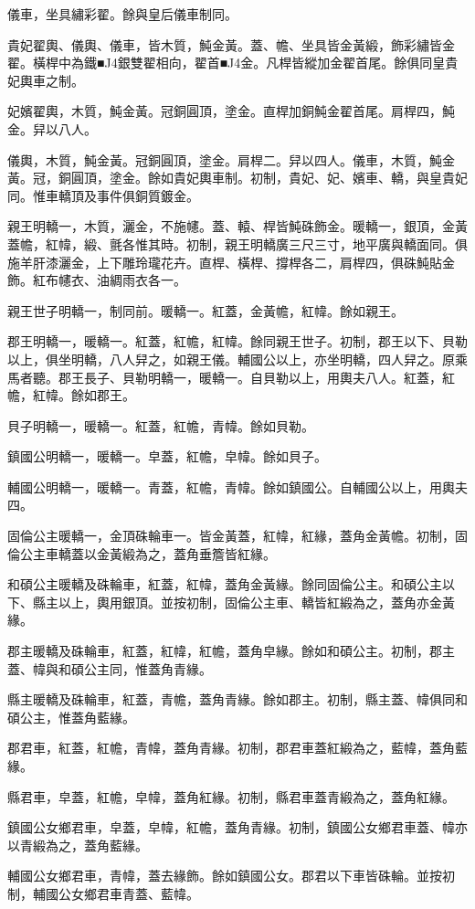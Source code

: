 \begin{pinyinscope}
儀車，坐具繡彩翟。餘與皇后儀車制同。

貴妃翟輿、儀輿、儀車，皆木質，魨金黃。蓋、幨、坐具皆金黃緞，飾彩繡皆金翟。橫桿中為鐵■J4銀雙翟相向，翟首■J4金。凡桿皆縱加金翟首尾。餘俱同皇貴妃輿車之制。

妃嬪翟輿，木質，魨金黃。冠銅圓頂，塗金。直桿加銅魨金翟首尾。肩桿四，魨金。舁以八人。

儀輿，木質，魨金黃。冠銅圓頂，塗金。肩桿二。舁以四人。儀車，木質，魨金黃。冠，銅圓頂，塗金。餘如貴妃輿車制。初制，貴妃、妃、嬪車、轎，與皇貴妃同。惟車轎頂及事件俱銅質鍍金。

親王明轎一，木質，灑金，不施幰。蓋、轅、桿皆魨硃飾金。暖轎一，銀頂，金黃蓋幨，紅幃，緞、氈各惟其時。初制，親王明轎廣三尺三寸，地平廣與轎面同。俱施羊肝漆灑金，上下雕玲瓏花卉。直桿、橫桿、撐桿各二，肩桿四，俱硃魨貼金飾。紅布幰衣、油綢雨衣各一。

親王世子明轎一，制同前。暖轎一。紅蓋，金黃幨，紅幃。餘如親王。

郡王明轎一，暖轎一。紅蓋，紅幨，紅幃。餘同親王世子。初制，郡王以下、貝勒以上，俱坐明轎，八人舁之，如親王儀。輔國公以上，亦坐明轎，四人舁之。原乘馬者聽。郡王長子、貝勒明轎一，暖轎一。自貝勒以上，用輿夫八人。紅蓋，紅幨，紅幃。餘如郡王。

貝子明轎一，暖轎一。紅蓋，紅幨，青幃。餘如貝勒。

鎮國公明轎一，暖轎一。皁蓋，紅幨，皁幃。餘如貝子。

輔國公明轎一，暖轎一。青蓋，紅幨，青幃。餘如鎮國公。自輔國公以上，用輿夫四。

固倫公主暖轎一，金頂硃輪車一。皆金黃蓋，紅幃，紅緣，蓋角金黃幨。初制，固倫公主車轎蓋以金黃緞為之，蓋角垂簷皆紅緣。

和碩公主暖轎及硃輪車，紅蓋，紅幃，蓋角金黃緣。餘同固倫公主。和碩公主以下、縣主以上，輿用銀頂。並按初制，固倫公主車、轎皆紅緞為之，蓋角亦金黃緣。

郡主暖轎及硃輪車，紅蓋，紅幃，紅幨，蓋角皁緣。餘如和碩公主。初制，郡主蓋、幃與和碩公主同，惟蓋角青緣。

縣主暖轎及硃輪車，紅蓋，青幨，蓋角青緣。餘如郡主。初制，縣主蓋、幃俱同和碩公主，惟蓋角藍緣。

郡君車，紅蓋，紅幨，青幃，蓋角青緣。初制，郡君車蓋紅緞為之，藍幃，蓋角藍緣。

縣君車，皁蓋，紅幨，皁幃，蓋角紅緣。初制，縣君車蓋青緞為之，蓋角紅緣。

鎮國公女鄉君車，皁蓋，皁幃，紅幨，蓋角青緣。初制，鎮國公女鄉君車蓋、幃亦以青緞為之，蓋角藍緣。

輔國公女鄉君車，青幃，蓋去緣飾。餘如鎮國公女。郡君以下車皆硃輪。並按初制，輔國公女鄉君車青蓋、藍幃。


\end{pinyinscope}
